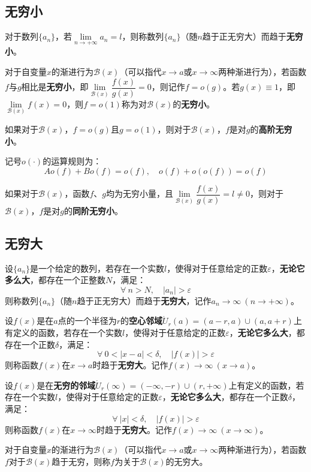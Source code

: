 \documentclass[fontset=none,openany,a4paper]{ctexbook}
\begin{document}
\subsection{无穷小}

对于数列$\{a_n\}$，若$\lim\limits_{n\to+\infty}a_n=l$，则称数列$\{a_n\}$（随$n$趋于正无穷大）而趋于\textbf{无穷小}。

对于自变量$x$的渐进行为$\mathcal{B}(x)$（可以指代$x\to a$或$x\to\infty$两种渐进行为），若函数$f$与$g$相比是\textbf{无穷小}，即$\lim\limits_{\mathcal{B}(x)}\dfrac{f(x)}{g(x)}=0$，则记作$f=o(g)$。若$g(x)\equiv1$，即$\lim\limits_{\mathcal{B}(x)}f(x)=0$，则$f=o(1)$称为对$\mathcal{B}(x)$的\textbf{无穷小}。

如果对于$\mathcal{B}(x)$，$f=o(g)$且$g=o(1)$，则对于$\mathcal{B}(x)$，$f$是对$g$的\textbf{高阶无穷小}。

记号$o(\cdot)$的运算规则为：
\[
Ao(f) + Bo(f) = o(f),\quad o(f) + o(o(f)) = o(f)
\]

如果对于$\mathcal{B}(x)$，函数$f$、$g$均为无穷小量，且$\lim\limits_{\mathcal{B}(x)}\dfrac{f(x)}{g(x)}=l\neq 0$，则对于$\mathcal{B}(x)$，$f$是对$g$的\textbf{同阶无穷小}。

\subsection{无穷大}

设$\{a_n\}$是一个给定的数列，若存在一个实数$l$，使得对于任意给定的正数$\varepsilon$，\textbf{无论它多么大}，都存在一个正整数$N$，满足：
\[
\forall\ n>N,\quad |a_n|>\varepsilon
\]
则称数列$\{a_n\}$（随$n$趋于正无穷大）而趋于\textbf{无穷大}，记作$a_n\to \infty\ (n\to+\infty)$。

设$f(x)$是在$a$点的一个半径为$r$的\textbf{空心邻域}$\mathring{U}_r(a)=(a-r,a)\cup(a,a+r)$上有定义的函数，若存在一个实数$l$，使得对于任意给定的正数$\varepsilon$，\textbf{无论它多么大}，都存在一个正数$\delta$，满足：
\[
\forall\ 0<|x-a|<\delta,\quad |f(x)|>\varepsilon
\]
则称函数$f(x)$在$x\to a$时趋于\textbf{无穷大}。记作$f(x)\to\infty\ (x\to a)$。

设$f(x)$是在\textbf{无穷的邻域}$\mathring{U}_r(\infty)=(-\infty,-r)\cup(r,+\infty)$上有定义的函数，若存在一个实数$l$，使得对于任意给定的正数$\varepsilon$，\textbf{无论它多么大}，都存在一个正数$\delta$，满足：
\[
\forall\ |x|<\delta,\quad |f(x)|>\varepsilon
\]
则称函数$f(x)$在$x\to\infty$时趋于\textbf{无穷大}。记作$f(x)\to\infty\ (x\to\infty)$。

对于自变量$x$的渐进行为$\mathcal{B}(x)$（可以指代$x\to a$或$x\to\infty$两种渐进行为），若函数$f$对于$\mathcal{B}(x)$趋于无穷，则称$f$为关于$\mathcal{B}(x)$的无穷大。
\end{document}
